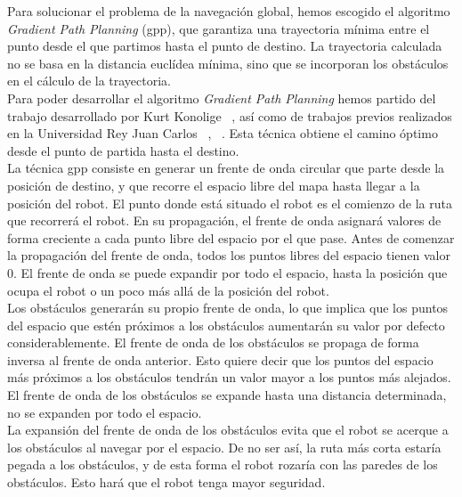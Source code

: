 Para solucionar el problema de la navegación global, hemos escogido el algoritmo \textit{Gradient Path Planning} (\acrshort{gpp}), que garantiza una trayectoria mínima entre el punto desde el que partimos hasta el punto de destino. La trayectoria calculada no se basa en la distancia euclídea mínima, sino que se incorporan los obstáculos en el cálculo de la trayectoria.\\

Para poder desarrollar el algoritmo \textit{Gradient Path Planning} hemos partido del trabajo desarrollado por Kurt Konolige  ~\cite{gradient}, así como de trabajos previos realizados en la Universidad Rey Juan Carlos ~\cite{navegacion_autolocalizacion3}, ~\cite{navegacion_autolocalizacion4}. Esta técnica obtiene el camino óptimo desde el punto de partida hasta el destino.\\

La técnica \acrshort{gpp} consiste en generar un frente de onda circular que parte desde la posición de destino, y que recorre el espacio libre del mapa hasta llegar a la posición del robot. El punto donde está situado el robot es el comienzo de la ruta que recorrerá el robot. En su propagación, el frente de onda asignará valores de forma creciente a cada punto libre del espacio por el que pase. Antes de comenzar la propagación del frente de onda, todos los puntos libres del espacio tienen valor 0. El frente de onda se puede expandir por todo el espacio, hasta la posición que ocupa el robot o un poco más allá de la posición del robot.\\

Los obstáculos generarán su propio frente de onda, lo que implica que los puntos del espacio que estén próximos a los obstáculos aumentarán su valor por defecto considerablemente. El frente de onda de los obstáculos se propaga de forma inversa al frente de onda anterior. Esto quiere decir que los puntos del espacio más próximos a los obstáculos tendrán un valor mayor a los puntos más alejados. El frente de onda de los obstáculos se expande hasta una distancia determinada, no se expanden por todo el espacio.\\

La expansión del frente de onda de los obstáculos evita que el robot se acerque a los obstáculos al navegar por el espacio. De no ser así, la ruta más corta estaría pegada a los obstáculos, y de esta forma el robot rozaría con las paredes de los obstáculos. Esto hará que el robot tenga mayor seguridad.\\

